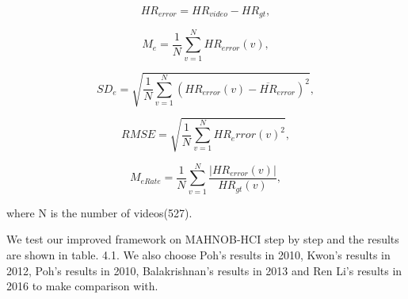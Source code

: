     \begin{equation}
        HR_{error} = HR_{video}-HR_{gt},
    \end{equation}

    \begin{equation}
        M_e = \frac{1}{N}\sum_{v=1}^{N}HR_{error}(v),
    \end{equation} 

    \begin{equation}
        SD_e = \sqrt{\frac{1}{N}\sum_{v=1}^{N}(HR_{error}(v)-\overline{HR}_{error})^{2}},
    \end{equation} 

    \begin{equation}
        RMSE = \sqrt{\frac{1}{N}\sum_{v=1}^{N}HR_error(v)^{2}},
    \end{equation} 

    \begin{equation}
        M_{eRate} = \frac{1}{N}\sum_{v=1}^{N}\frac{|HR_{error}(v)|}{HR_{gt}(v)},
    \end{equation} 

where N is the number of videos(527).

We test our improved framework on MAHNOB-HCI step by step and the results are shown in table. 4.1. We also choose Poh's results in 2010, Kwon's results in 2012, Poh's results in 2010, Balakrishnan's results in 2013 and Ren Li's results in 2016 to make comparison with. 


